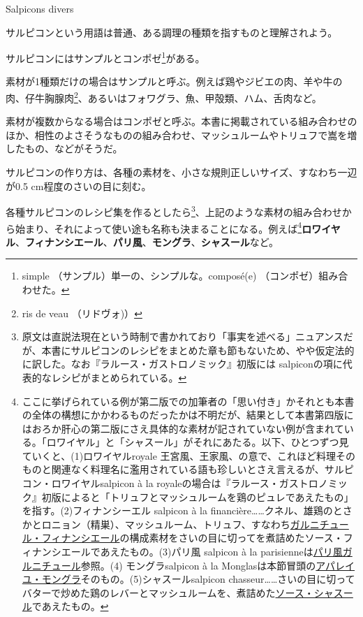 \begin{recette}
\begin{frsubenv}

Salpicons divers

\end{frsubenv}

 

サルピコンという用語は普通、ある調理の種類を指すものと理解されよう。

サルピコンにはサンプルとコンポゼ\footnote{simple
  （サンプル）単一の、シンプルな。composé(e) （コンポゼ）組み合わせた。}がある。

素材が1種類だけの場合はサンプルと呼ぶ。例えば鶏やジビエの肉、羊や牛の肉、仔牛胸腺肉\footnote{ris
  de veau （リドヴォ)）}、あるいはフォワグラ、魚、甲殻類、ハム、舌肉など。

素材が複数からなる場合はコンポゼと呼ぶ。本書に掲載されている組み合わせのほか、相性のよさそうなものの組み合わせ、マッシュルームやトリュフで嵩を増したもの、などがそうだ。

サルピコンの作り方は、各種の素材を、小さな規則正しいサイズ、すなわち一辺が0.5
cm程度のさいの目に刻む。

各種サルピコンのレシピ集を作るとしたら\footnote{原文は直説法現在という時制で書かれており「事実を述べる」ニュアンスだが、本書にサルピコンのレシピをまとめた章も節もないため、やや仮定法的に訳した。なお『ラルース・ガストロノミック』初版には
  salpiconの項に代表的なレシピがまとめられている。}、上記のような素材の組み合わせから始まり、それによって使い途も名称も決まることになる。例えば\footnote{ここに挙げられている例が第二版での加筆者の「思い付き」かそれとも本書の全体の構想にかかわるものだったかは不明だが、結果として本書第四版にはおろか肝心の第二版にさえ具体的な素材が記されていない例が含まれている。「ロワイヤル」と「シャスール」がそれにあたる。以下、ひとつずつ見ていくと、(1)ロワイヤルroyale
  王宮風、王家風、の意で、これほど料理そのものと関連なく料理名に濫用されている語も珍しいとさえ言えるが、サルピコン・ロワイヤルsalpicon
  à la
  royaleの場合は『ラルース・ガストロノミック』初版によると「トリュフとマッシュルームを鶏のピュレであえたもの」を指す。(2)フィナンシーエル
  salpicon à la
  financière\ldots{}\ldots{}クネル、雄鶏のとさかとロニョン（精巣）、マッシュルーム、トリュフ、すなわち\protect\hyperlink{garniture-financiere}{ガルニチュール・フィナンシエール}の構成素材をさいの目に切ってを煮詰めたソース・フィナンシエールであえたもの。(3)パリ風
  salpicon à la
  parisienneは\protect\hyperlink{garniture-parisienne}{パリ風ガルニチュール}参照。(4)
  モングラsalpicon à la
  Monglasは本節冒頭の\protect\hyperlink{appareil-montglas}{アパレイユ・モングラ}そのもの。(5)シャスールsalpicon
  chasseur\ldots{}\ldots{}さいの目に切ってバターで炒めた鶏のレバーとマッシュルームを、煮詰めた\protect\hyperlink{sauce-chasseur}{ソース・シャスール}であえたもの。}\textbf{ロワイヤル}、\textbf{フィナンシエール}、\textbf{パリ風}、\textbf{モングラ}、\textbf{シャスール}など。


\end{recette}
